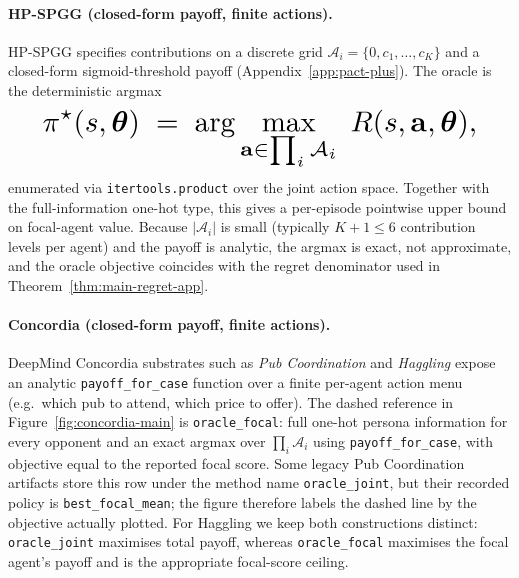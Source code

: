 \paragraph{HP-SPGG (closed-form payoff, finite actions).} HP-SPGG specifies contributions on a discrete grid $\mathcal{A}_i = \{0, c_1, \ldots, c_K\}$ and a closed-form sigmoid-threshold payoff (Appendix~\ref{app:pact-plus}). The oracle is the deterministic argmax
\begin{equation*}\resizebox{0.9\linewidth}{!}{$\displaystyle \pi^\star(s, \boldsymbol{\theta}) \;=\; \arg\max_{\mathbf{a} \in \prod_i \mathcal{A}_i} \; R(s, \mathbf{a}, \boldsymbol{\theta}), $}\end{equation*}
enumerated via \texttt{itertools.product} over the joint action space. Together with the full-information one-hot type, this gives a per-episode pointwise upper bound on focal-agent value. Because $|\mathcal{A}_i|$ is small (typically $K{+}1 \leq 6$ contribution levels per agent) and the payoff is analytic, the argmax is exact, not approximate, and the oracle objective coincides with the regret denominator used in Theorem~\ref{thm:main-regret-app}.

\paragraph{Concordia (closed-form payoff, finite actions).} DeepMind Concordia substrates such as \emph{Pub Coordination} and \emph{Haggling} \citep{vezhnevets2023concordia} expose an analytic \texttt{payoff\_for\_case} function over a finite per-agent action menu (e.g.\ which pub to attend, which price to offer). The dashed reference in Figure~\ref{fig:concordia-main} is \texttt{oracle\_focal}: full one-hot persona information for every opponent and an exact argmax over $\prod_i \mathcal{A}_i$ using \texttt{payoff\_for\_case}, with objective equal to the reported focal score. Some legacy Pub Coordination artifacts store this row under the method name \texttt{oracle\_joint}, but their recorded policy is \texttt{best\_focal\_mean}; the figure therefore labels the dashed line by the objective actually plotted. For Haggling we keep both constructions distinct: \texttt{oracle\_joint} maximises total payoff, whereas \texttt{oracle\_focal} maximises the focal agent's payoff and is the appropriate focal-score ceiling.

